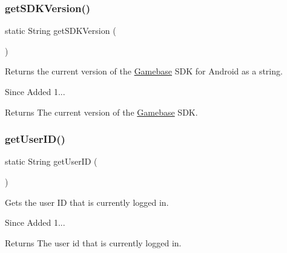 \subsubsection{\texorpdfstring{get\+S\+D\+K\+Version()}{getSDKVersion()}}
{\footnotesize\ttfamily static String get\+S\+D\+K\+Version (\begin{DoxyParamCaption}{ }\end{DoxyParamCaption})\hspace{0.3cm}{\ttfamily [static]}}



Returns the current version of the \hyperlink{classcom_1_1toast_1_1android_1_1gamebase_1_1_gamebase}{Gamebase} S\+DK for Android as a string. 

\begin{DoxySince}{Since}
Added 1... 
\end{DoxySince}
\begin{DoxyReturn}{Returns}
The current version of the \hyperlink{classcom_1_1toast_1_1android_1_1gamebase_1_1_gamebase}{Gamebase} S\+DK. 
\end{DoxyReturn}
\mbox{\label{classcom_1_1toast_1_1android_1_1gamebase_1_1_gamebase_ab7c1e87ef968e274d77774ea7c814f07}} 
\subsubsection{\texorpdfstring{get\+User\+I\+D()}{getUserID()}}
{\footnotesize\ttfamily static String get\+User\+ID (\begin{DoxyParamCaption}{ }\end{DoxyParamCaption})\hspace{0.3cm}{\ttfamily [static]}}



Gets the user ID that is currently logged in. 

\begin{DoxySince}{Since}
Added 1... 
\end{DoxySince}
\begin{DoxyReturn}{Returns}
The user id that is currently logged in. 
\end{DoxyReturn}
\mbox{\label{classcom_1_1toast_1_1android_1_1gamebase_1_1_gamebase_a1b2d26183c219ab1ef840a95af71bd88}} 
